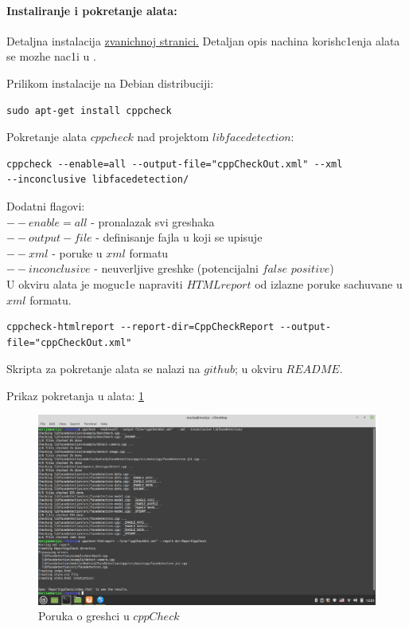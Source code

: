 \documentclass{article}
\begin{document}
\paragraph*{Instaliranje i pokretanje alata:}
Detaljna instalacija 
\href{https://cppcheck.sourceforge.io/}{zvanichnoj stranici.} 
Detaljan opis nachina korish\-c1enja alata se mozhe nac1i u \cite{cppCheckMan}.

Prilikom instalacije na Debian distribuciji:
\selectfont
\begin{verbatim}
sudo apt-get install cppcheck
\end{verbatim}

\selectfont
Pokretanje alata $cppcheck$ nad projektom $libfacedetection$: 

\selectfont
\begin{verbatim}
cppcheck --enable=all --output-file="cppCheckOut.xml" --xml
--inconclusive libfacedetection/
\end{verbatim}

\selectfont
Dodatni flagovi:\\
$--enable = all$ - pronalazak svi greshaka \\
$--output-file$ - definisanje fajla u koji se upisuje \\
$--xml$ - poruke u $xml$ formatu \\
$--inconclusive$ - neuverljive greshke (potencijalni $false$ $positive$)
\\
U okviru alata je moguc1e napraviti $HTML report$ od izlazne poruke sachuvane u $xml$ formatu. 

\selectfont
\begin{verbatim}
cppcheck-htmlreport --report-dir=CppCheckReport --output-file="cppCheckOut.xml" 
\end{verbatim}

\selectfont

Skripta za pokretanje alata se nalazi na $github$; u okviru $README$.

Prikaz pokretanja u alata: \ref{msg:cppcheck}

\begin{figure}[H]
    \centering
    \includegraphics[width=12cm]{img/cppCheckTerminal.png}
    \caption{Poruka o gresh\-ci u $cppCheck$}
    \label{msg:cppcheck}
\end{figure}
\end{document}

